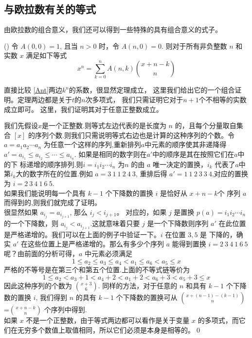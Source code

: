 \subsection{与欧拉数有关的等式}
由欧拉数的组合意义，我们还可以得到一些特殊的具有组合意义的式子。
\begin{thm}\label{t1}(\cite{Graham1994})
令 $A(0,0)=1$, 且当 $n>0$ 时，令 $A(n,0)=0$. 则对于所有非负整数 $n$
和实数 $x$ 满足如下等式
\begin{equation}\label{sm}
x^n=\sum_{k=0}^{n}A(n,k){x+n-k \choose n}
\end{equation}
\end{thm}

直接比较 \eqref{Ant}两边$k^n$的系数，很显然定理成立，
这里我们给出它的一个组合证明。定理两边都是关于$t$的$n$次多项式，
我们只需证明它对于$n+1$个不相等的实数成立即可。
这里，我们证明其对于任意正整数成立。

\pf 我们先假设$x$是一个正整数.则等式左边代表的是长度为 $n$
的，且每个分量取自集合 $[x]$
的序列个数.则我们只需说明等式右边也是计算的这种序列的个数。令
$a=a_{1}a_{2}\cdots a_n$
为任意一个这样的序列,重新排列$a$中元素的顺序使其非递降得
$a'=a_{i_{1}}\leq
a_{i_{2}}\leq \cdots \leq a_{i_{n}}$.
如果是相同的数字则在$a'$中的顺序是其在按照它们在$a$中的下
标递增的顺序排列.则$i=i_{1}i_{2}\cdots
i_{n}$ 为$n$ 的由 $a$ 唯一决定的置换，$i_{k}$
代表了$a$中第$i_{k}$大的数字所在的位置.例如 $a=3~1~1~2~4~3$,
重排后得 $a'=1~1~2~3~3~4$,对应的置换为 $i=2~3~4~1~6~5$.
\\
如果我们能说明每一个具有 $k-1$ 个下降数的置换 $i$ 是恰好从 $x+n-k$个
序列 $a$ 而得到的,则我们就完成了证明。
\\
很显然如果 $a_{i_{j}}=a_{i_{j+1}}$, 那么 $i_{j}<i_{j+1}$。
对应的，如果 $j$ 是置换 $p(a)=i_{1}i_{2}\cdots i_{n}$
的一个下降数，则 $a_{i_{j}}<a_{i_{j+1}}$.这就意味着只要 $j$
是一个下降数则序列 $a'$
在此位置是严格递增的。我们可以在上面的例子中验证一下。$i$ 在位置
$3,5$ 是 下降的，确实 $a'$
在这些位置上是严格递增的。那么有多少个序列 $a$ 能得到置换
$i=2~3~4~1~6~5$ 呢？由前面的分析可得，$a$ 中元素必须满足$$1\leq
a_{2}\leq a_{3} \leq a_{4} < a_{1} \leq a_6 <a_5 \leq x
$$严格的不等号是在第三个和第五个位置.上面的不等式链等价为
$$1\leq a_{2}< a_{3}+1
<a_{4}+2 < a_{1}+2 <a_6 +3 <a_5+3 \leq x$$ 因此这种序列的个数为
 ${x+3 \choose 6}$.
 同样的方法，对于任意的 $n$ 和具有 $k-1$ 个下降数的置换 $i$,
 我们得到 $n$ 的具有 $k-1$ 个下降数的置换可从
${x+(n-1)-(k-1)\choose n} $=${x+n-k \choose n}$ 个序列中得到.
\\如果 $x$ 不是一个正整数，由于等式两边都可以看作是关于变量 $x$
的多项式，而它们在无穷多个数值上取值相同，所以它们必须是本身是相等的。\qed



